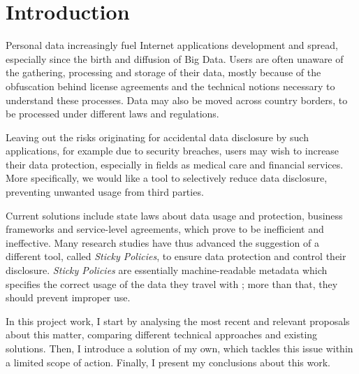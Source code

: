 \chapter{Introduction}
\label{Intro}
\thispagestyle{empty}

\noindent 
Personal data increasingly fuel Internet applications development and spread, especially since the birth and diffusion of Big Data. Users are often unaware of the gathering, processing and storage of their data, mostly because of the obfuscation behind license agreements and the technical notions necessary to understand these processes. Data may also be moved across country borders, to be processed under different laws and regulations.

Leaving out the risks originating for accidental data disclosure by such applications, for example due to security breaches, users may wish to increase their data protection, especially in fields as medical care and financial services. More specifically, we would like a tool to selectively reduce data disclosure, preventing unwanted usage from third parties.

Current solutions include state laws about data usage and protection, business frameworks and service-level agreements, which prove to be inefficient and ineffective. Many research studies have thus advanced the suggestion of a different tool, called \textit{Sticky Policies}, to ensure data protection and control their disclosure. \textit{Sticky Policies} are essentially machine-readable metadata which specifies the correct usage of the data they travel with \cite{pearson2011sticky}; more than that, they should prevent improper use.

In this project work, I start by analysing the most recent and relevant proposals about this matter, comparing different technical approaches and existing solutions. Then, I introduce a solution of my own, which tackles this issue within a limited scope of action. Finally, I present my conclusions about this work.


\iffalse
- internet funziona sempre più producendo risultati a partire da dati personali, e questa tendenza sta aumentando grazie al diffondersi di big data
- gli utenti sono, nella maggior parte dei casi, ignari dell'uso che viene fatto dei loro dati personali, e in ogni caso, spesso, tali servizi avvengono sotto legislazioni diverse, o avvengono per conto di ulteriori terze parti che potrebbero non rispettare i permessi inizialmente accordati.
- questi costituiscono dei rischi per la violazione della privacy e in generale potrebbero costituire una vulnerabilità, esposizione, degli utenti agli attacchi su internet.
- vorremmo che fosse possibile per gli utenti scegliere selettivamente cosa condividere, dando loro la possibilità di limitare la diffusione dei loro dati personali dovuta a servizi esterni.
- per fare ciò si propone l'uso di sticky policies, ossia metadati che restano agganciati ai dati a cui si riferiscono e danno indicazioni sul loro corretto utilizzo.
\fi